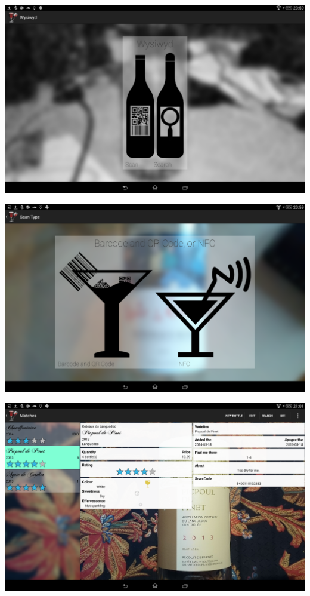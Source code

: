 \documentclass[11pt]{beamer}
\begin{document}
\logo{}

\begin{frame}
\includegraphics[scale=0.18]{Images/MainActivity.png}
\end{frame}

\begin{frame}
\includegraphics[scale=0.18]{Images/ScanChoice.png}
\end{frame}

\begin{frame}
\includegraphics[scale=0.18]{Images/ResultsActivity.png}
\end{frame}
\end{document}
